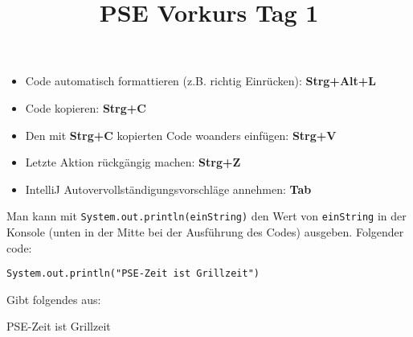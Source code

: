 \documentclass{../../sheet}
\title{PSE Vorkurs Tag 1}
\begin{document}
\maketitle

\begin{itemize}
    \item Code automatisch formattieren (z.B. richtig Einrücken): \textbf{Strg+Alt+L}
    \item Code kopieren: \textbf{Strg+C}
    \item Den mit \textbf{Strg+C} kopierten Code woanders einfügen: \textbf{Strg+V}
    \item Letzte Aktion rückgängig machen: \textbf{Strg+Z}
    \item IntelliJ Autovervollständigungsvorschläge annehmen: \textbf{Tab}
\end{itemize}
\newpage


Man kann mit \texttt{System.out.println(einString)} den Wert von \texttt{einString} in der Konsole (unten in der Mitte bei der Ausführung des Codes) ausgeben. Folgender code:
\begin{verbatim}
System.out.println("PSE-Zeit ist Grillzeit")
\end{verbatim}
Gibt folgendes aus:
\begin{ausgabe}
    PSE-Zeit ist Grillzeit
\end{ausgabe}
\end{document}

